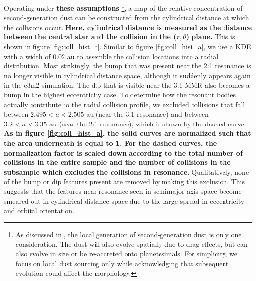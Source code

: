 \documentclass[fleqn,usenatbib]{mnras}
\begin{document}
Operating under \textbf{these assumptions} \footnote{As discussed in \cite{2017ApJ...850..103B}, the local generation of second-generation dust is only one 
consideration. The dust will also evolve spatially due to drag effects, but can also evolve in size or be re-accreted onto planetesimals. For simplicity, 
we focus on local dust sourcing only while acknowledging that subsequent evolution could affect the morphology.}, a map of the relative concentration 
of second-generation dust can be constructed from the cylindrical distance at which the collisions occur. \textbf{Here, cylindrical distance is measured as the distance between the central star and the collision in the ($r, \theta$) plane.} This is shown in figure \ref{fig:coll_hist_r}. 
Similar to figure \ref{fig:coll_hist_a}, we use a KDE with a width of 0.02 au to assemble the collision locations into a radial distribution. Most 
strikingly, the bump that was present near the 2:1 resonance is no longer visible in cylindrical distance space, although it suddenly appears again in 
the e3m2 simulation. The dip that is visible near the 3:1 MMR also becomes a bump in the highest eccentricity case. To determine how the resonant 
bodies actually contribute to the radial collision profile, we excluded collisions that fall between $2.495 < a < 2.505$ au (near the 3:1 resonance) and 
between $3.2 < a < 3.35$ au (near the 2:1 resonance), which is shown by the dashed curve. \textbf{As in figure \ref{fig:coll_hist_a}, the solid curves are normalized such that the area underneath is equal to 1. For the dashed curves, the normalization factor is scaled down according to the total number of collisions in the entire sample and the number of collisions in the subsample which excludes the collisions in resonance.} Qualitatively, none of the bump or dip features present 
are removed by making this exclusion. This suggests that the features near resonance seen in semimajor axis space become smeared out in 
cylindrical distance space due to the large spread in eccentricity and orbital orientation.
\end{document}

